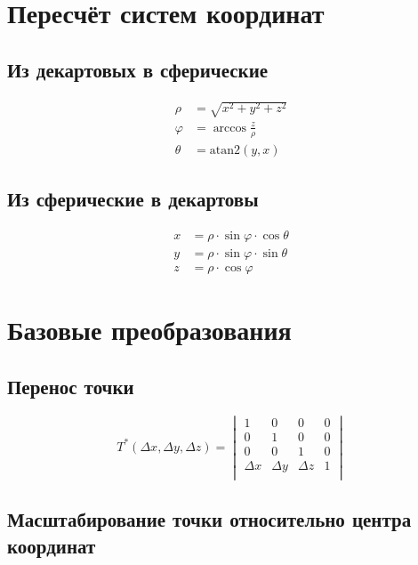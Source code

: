 \documentclass[a4paper]{article}
\theoremstyle{hangindent}
\theoremstyle{hangindent}
\newcommand\atanT[2]{\mbox{atan2}\left(#1, #2\right)}
\begin{document}
\section{Пересчёт систем координат}
\subsection{Из декартовых в сферические}
\begin{align}
    \rho    & = \sqrt{x^2 + y^2 + z^2} \\
    \varphi & = \arccos{\frac{z}{\rho}} \\
    \theta  & = \atanT{y}{x}
\end{align}

\subsection{Из сферические в декартовы}
\begin{align}
    x &= \rho \cdot \sin{\varphi} \cdot \cos{\theta} \\
    y &= \rho \cdot \sin{\varphi} \cdot \sin{\theta} \\
    z &= \rho \cdot \cos{\varphi}
\end{align}

\section{Базовые преобразования}

\subsection{Перенос точки}

\begin{equation}
    T^*(\Delta x, \Delta y, \Delta z) =
    \begin{vmatrix}
        1        & 0        & 0        & 0 \\
        0        & 1        & 0        & 0 \\
        0        & 0        & 1        & 0 \\
        \Delta x & \Delta y & \Delta z & 1 \\
    \end{vmatrix}
\end{equation}

\subsection{Масштабирование точки относительно центра координат}
\end{document}
